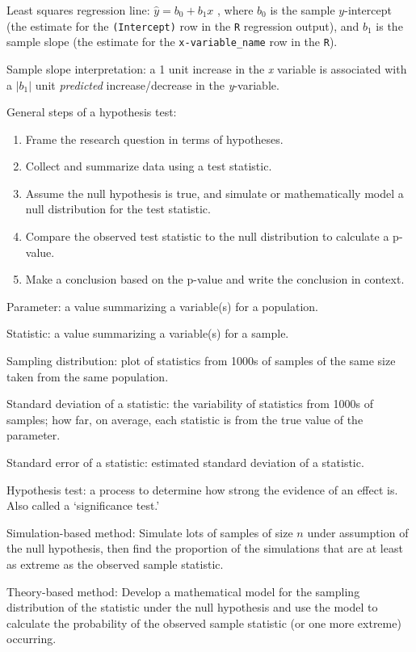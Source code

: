 \documentclass[
]{report}
\begin{document}

Least squares regression line: \(\hat{y} = b_0+b_1x\) , where \(b_0\) is the sample \(y\)-intercept (the estimate for the \texttt{(Intercept)} row in the \texttt{R} regression output), and \(b_1\) is the sample slope (the estimate for the \texttt{x-variable\_name} row in the \texttt{R}).

Sample slope interpretation: a 1 unit increase in the \emph{x} variable is associated with a \(|b_1 |\) unit \emph{predicted} increase/decrease in the \emph{y}-variable.

General steps of a hypothesis test:

\begin{enumerate}
\def\labelenumi{\arabic{enumi}.}
\item
  Frame the research question in terms of hypotheses.
\item
  Collect and summarize data using a test statistic.
\item
  Assume the null hypothesis is true, and simulate or mathematically model a null distribution for the test statistic.
\item
  Compare the observed test statistic to the null distribution to calculate a p-value.
\item
  Make a conclusion based on the p-value and write the conclusion in context.
\end{enumerate}

Parameter: a value summarizing a variable(s) for a population.

Statistic: a value summarizing a variable(s) for a sample.

Sampling distribution: plot of statistics from 1000s of samples of the same size taken from the same population.

Standard deviation of a statistic: the variability of statistics from 1000s of samples; how far, on average, each statistic is from the true value of the parameter.

Standard error of a statistic: estimated standard deviation of a statistic.

Hypothesis test: a process to determine how strong the evidence of an effect is. Also called a `significance test.'

Simulation-based method: Simulate lots of samples of size \(n\) under assumption of the null hypothesis, then find the proportion of the simulations that are at least as extreme as the observed sample statistic.

Theory-based method: Develop a mathematical model for the sampling distribution of the statistic under the null hypothesis and use the model to calculate the probability of the observed sample statistic (or one more extreme) occurring.
\end{document}
